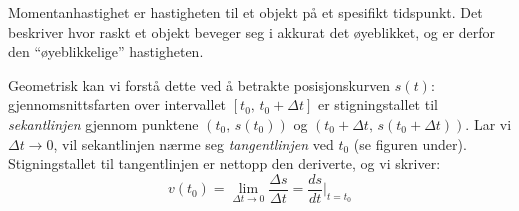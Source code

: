 Momentanhastighet er hastigheten til et objekt på et spesifikt tidspunkt. Det beskriver hvor raskt et objekt beveger seg i akkurat det øyeblikket, og er derfor den ``øyeblikkelige'' hastigheten.

Geometrisk kan vi forstå dette ved å betrakte posisjonskurven $s(t)$: gjennomsnittsfarten over intervallet $[t_0,\,t_0+\Delta t]$ er stigningstallet til \textit{sekantlinjen} gjennom punktene $(t_0,\,s(t_0))$ og $(t_0+\Delta t,\,s(t_0+\Delta t))$. Lar vi $\Delta t \to 0$, vil sekantlinjen nærme seg \textit{tangentlinjen} ved $t_0$ (se figuren under). Stigningstallet til tangentlinjen er nettopp den deriverte, og vi skriver:
\[
  v(t_0)
  = \lim_{\Delta t \to 0} \frac{\Delta s}{\Delta t}
  = \frac{ds}{dt}\bigg|_{t=t_0}
\]

